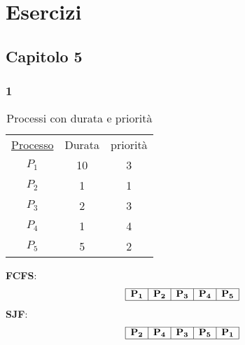 \setcounter{chapter}{98}
\chapter{Esercizi}
\section{Capitolo 5}
\subsection{1}
\begin{table}[h]
    \centering
    \begin{tabular}{c c c}
        \underline{Processo} & Durata & priorità \\
        $P_1$ & 10 & 3 \\
        $P_2$ & 1 & 1 \\
        $P_3$ & 2 & 3 \\
        $P_4$ & 1 & 4 \\
        $P_5$ & 5 & 2 \\
    \end{tabular}
    \caption{Processi con durata e priorità}
    \label{tab:processi}
\end{table}
\textbf{FCFS}:
\[
\begin{array}{|c|c|c|c|c|}
  \hline
  \mathbf{P_1} & \mathbf{P_2} & \mathbf{P_3} & \mathbf{P_4} & \mathbf{P_5} \\
  \hline
\end{array}
\]
\textbf{SJF}:
\[\begin{array}{|c|c|c|c|c|}
  \hline
  \mathbf{P_2} & \mathbf{P_4} & \mathbf{P_3} & \mathbf{P_5} & \mathbf{P_1} \\
  \hline
\end{array}\]
